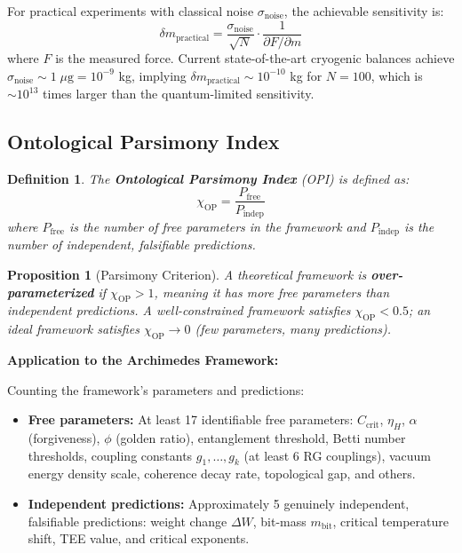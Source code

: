 \documentclass[11pt,a4paper]{article}
\newtheorem{proposition}{Proposition}
\newtheorem{definition}{Definition}
\begin{document}
For practical experiments with classical noise $\sigma_{\text{noise}}$, the achievable sensitivity is:
\begin{equation}
  \delta m_{\text{practical}} = \frac{\sigma_{\text{noise}}}{\sqrt{N}} \cdot \frac{1}{\partial F / \partial m}
\end{equation}
where $F$ is the measured force. Current state-of-the-art cryogenic balances achieve $\sigma_{\text{noise}} \sim 1\;\mu\text{g} = 10^{-9}$ kg, implying $\delta m_{\text{practical}} \sim 10^{-10}$ kg for $N = 100$, which is $\sim 10^{13}$ times larger than the quantum-limited sensitivity.

\subsection{Ontological Parsimony Index}

\begin{definition}
The \textbf{Ontological Parsimony Index} (OPI) is defined as:
\begin{equation}
  \chi_{\text{OP}} = \frac{P_{\text{free}}}{P_{\text{indep}}}
  \label{eq:opi}
\end{equation}
where $P_{\text{free}}$ is the number of free parameters in the framework and $P_{\text{indep}}$ is the number of independent, falsifiable predictions.
\end{definition}

\begin{proposition}[Parsimony Criterion]
A theoretical framework is \textbf{over-parameterized} if $\chi_{\text{OP}} > 1$, meaning it has more free parameters than independent predictions. A well-constrained framework satisfies $\chi_{\text{OP}} < 0.5$; an ideal framework satisfies $\chi_{\text{OP}} \to 0$ (few parameters, many predictions).
\end{proposition}

\textbf{Application to the Archimedes Framework:}

Counting the framework's parameters and predictions:
\begin{itemize}[leftmargin=1.5em]
  \item \textbf{Free parameters:} At least 17 identifiable free parameters: $C_{\text{crit}}$, $\eta_H$, $\alpha$ (forgiveness), $\phi$ (golden ratio), entanglement threshold, Betti number thresholds, coupling constants $g_1, \ldots, g_k$ (at least 6 RG couplings), vacuum energy density scale, coherence decay rate, topological gap, and others.
  \item \textbf{Independent predictions:} Approximately 5 genuinely independent, falsifiable predictions: weight change $\Delta W$, bit-mass $m_{\text{bit}}$, critical temperature shift, TEE value, and critical exponents.
\end{itemize}
\end{document}
